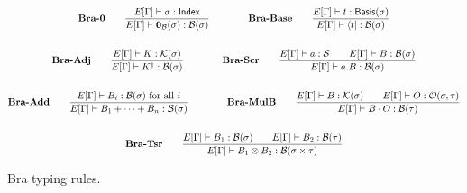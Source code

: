 \documentclass{article}
\begin{document}
\begin{figure}[h]
    \begin{gather*}
        \textbf{Bra-0} \qquad
        \frac{E[\Gamma] \vdash \sigma : \mathsf{Index}}{E[\Gamma] \vdash \mathbf{0}_\mathcal{B}(\sigma) : \mathcal{B}(\sigma)} 
        \qquad \qquad
        \textbf{Bra-Base} \qquad
        \frac{E[\Gamma]\vdash t : \mathsf{Basis}(\sigma)}{E[\Gamma] \vdash \bra{t} : \mathcal{B}(\sigma)} \\
        \\
        \textbf{Bra-Adj} \qquad
        \frac{E[\Gamma] \vdash K : \mathcal{K}(\sigma)}{E[\Gamma] \vdash K^\dagger : \mathcal{B}(\sigma)} 
        \qquad \qquad
        \textbf{Bra-Scr} \qquad
        \frac{E[\Gamma] \vdash a : \mathcal{S} \qquad E[\Gamma] \vdash B : \mathcal{B}(\sigma)}{E[\Gamma] \vdash a.B : \mathcal{B}(\sigma)} \\
        \\
        \textbf{Bra-Add} \qquad
        \frac{E[\Gamma] \vdash B_i : \mathcal{B}(\sigma) \text{ for all $i$}}{E[\Gamma] \vdash B_1 + \cdots + B_n : \mathcal{B}(\sigma)}
        \qquad \qquad
        \textbf{Bra-MulB} \qquad
        \frac{E[\Gamma] \vdash B : \mathcal{K}(\sigma) \qquad E[\Gamma] \vdash O : \mathcal{O}(\sigma, \tau)}{E[\Gamma] \vdash B \cdot O : \mathcal{B}(\tau)} \\
        \\
        \textbf{Bra-Tsr} \qquad
        \frac{E[\Gamma] \vdash B_1 : \mathcal{B}(\sigma) \qquad E[\Gamma] \vdash B_2 : \mathcal{B}(\tau)} {E[\Gamma] \vdash B_1 \otimes B_2 : \mathcal{B}(\sigma \times \tau)}
    \end{gather*}
    \caption{Bra typing rules.}
\end{figure}
\end{document}
